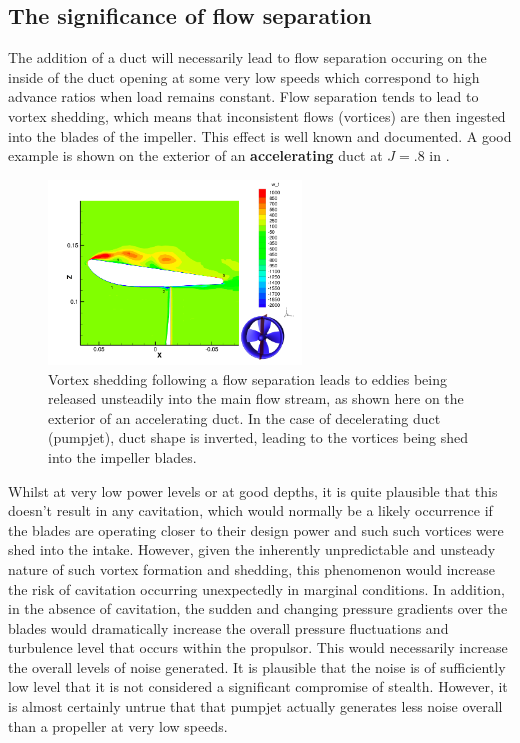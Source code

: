 \documentclass{article}\usepackage[]{graphicx}\usepackage[]{color}
\begin{document}
\subsection{The significance of flow separation}
The addition of a duct will necessarily lead to flow separation occuring on the inside of the duct opening at some very low speeds which correspond to high advance ratios when load remains constant.  Flow separation tends to lead to vortex shedding, which means that inconsistent flows (vortices) are then ingested into the blades of the impeller.  This effect is well known and documented.  A good example is shown on the exterior of an \textbf{accelerating} duct at $J = .8$ in \cite{willemsen2013}.

\begin{figure}[h]
\captionsetup{width=0.5\textwidth}
\includegraphics[width=0.6\textwidth, center]{VortexShedding.png}
\caption{Vortex shedding following a flow separation leads to eddies being released unsteadily into the main flow stream, as shown here on the exterior of an accelerating duct.  In the case of decelerating duct (pumpjet), duct shape is inverted, leading to the vortices being shed into the impeller blades. \parencite{willemsen2013}}
\label{fig:VortexShedding.png}
\end{figure}

Whilst at very low power levels or at good depths, it is quite plausible that this doesn't result in any cavitation, which would normally be a likely occurrence if the blades are operating closer to their design power and such such vortices were shed into the intake.  However, given the inherently unpredictable and unsteady nature of such vortex formation and shedding, this phenomenon would increase the risk of cavitation occurring unexpectedly in marginal conditions.  In addition, in the absence of cavitation, the sudden and changing pressure gradients over the blades would dramatically increase the overall pressure fluctuations and turbulence level that occurs within the propulsor.  This would necessarily increase the overall levels of noise generated.  It is plausible that the noise is of sufficiently low level that it is not considered a significant compromise of stealth.  However, it is almost certainly untrue that that pumpjet actually generates less noise overall than a propeller at very low speeds.
\end{document}
